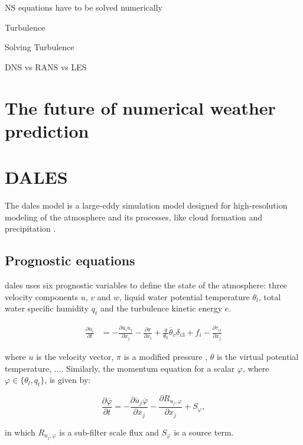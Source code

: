 NS equations have to be solved numerically

Turbulence 

Solving Turbulence

DNS vs RANS vs LES

\section{The future of numerical weather prediction}

\section{DALES}
The \acrfull{dales} model is a large-eddy simulation model designed for high-resolution modeling of the atmosphere and its processes, like cloud formation and precipitation \citep{heusFormulationDutchAtmospheric2010,ouwerslootLargeEddySimulationComparison2017}. 

\subsection{Prognostic equations}
\acrshort{dales} uses six prognostic variables to define the state of the atmosphere: three velocity components $u$, $v$ and $w$, liquid water potential temperature $\theta_l$, total water specific humidity $q_t$ and the turbulence kinetic energy $e$. 

\begin{align}
    \frac{\partial \overline{u}_i}{\partial t} &= - \frac{\partial \overline{u}_i \overline{u}_j}{\partial x_j} - \frac{\partial \pi}{\partial x_i} + \frac{g}{\theta_0}\overline{\theta}_v \delta_{i3} + f_i - \frac{\partial \tau_{ij}}{\partial x_j} \label{eq:momentum_conservation}
\end{align}

where $u$ is the velocity vector, $\pi$ is a modified pressure , $\theta$ is the virtual potential temperature, .... Similarly, the momentum equation for a scalar $\varphi$, where $\varphi \in \{\theta_l, q_t\}$, is given by:

\begin{equation}
    \frac{\partial \overline{\varphi}}{\partial t} = - \frac{\partial \overline{u}_j \overline{\varphi}}{\partial x_j} - \frac{\partial R_{u_j,\varphi}}{\partial x_j} + S_\varphi,
\end{equation}

in which $R_{u_j,\varphi}$ is a sub-filter scale flux and $S_\varphi$ is a source term.


